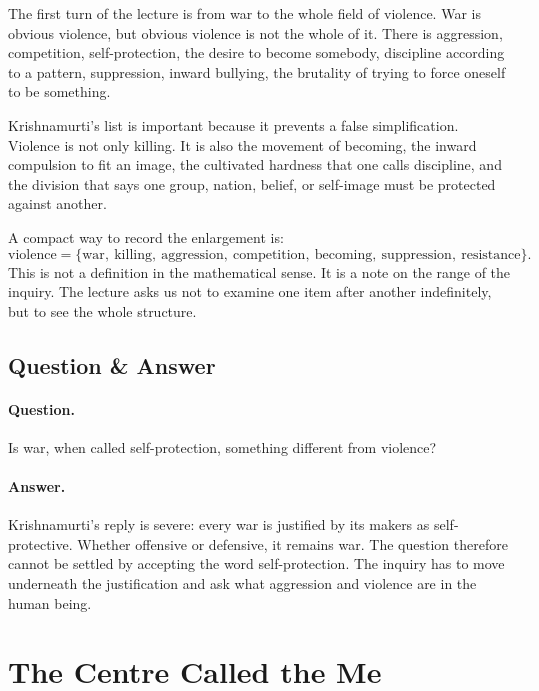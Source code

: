 The first turn of the lecture is from war to the whole field of violence. War is obvious violence, but obvious violence is not the whole of it. There is aggression, competition, self-protection, the desire to become somebody, discipline according to a pattern, suppression, inward bullying, the brutality of trying to force oneself to be something.

Krishnamurti's list is important because it prevents a false simplification. Violence is not only killing. It is also the movement of becoming, the inward compulsion to fit an image, the cultivated hardness that one calls discipline, and the division that says one group, nation, belief, or self-image must be protected against another.

A compact way to record the enlargement is:
\begin{equation}
\text{violence}
=
\{\text{war},\ \text{killing},\ \text{aggression},\ \text{competition},\ \text{becoming},\ \text{suppression},\ \text{resistance}\}.
\end{equation}
This is not a definition in the mathematical sense. It is a note on the range of the inquiry. The lecture asks us not to examine one item after another indefinitely, but to see the whole structure.

\subsection{Question \& Answer}

\paragraph{Question.}
Is war, when called self-protection, something different from violence?

\paragraph{Answer.}
Krishnamurti's reply is severe: every war is justified by its makers as self-protective. Whether offensive or defensive, it remains war. The question therefore cannot be settled by accepting the word self-protection. The inquiry has to move underneath the justification and ask what aggression and violence are in the human being.

\section{The Centre Called the Me}

